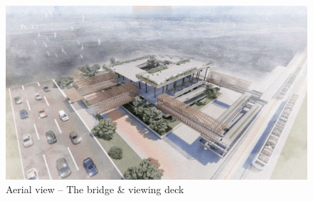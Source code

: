 ﻿%
\begin{figure}[H]
	\centering
	\includegraphics[width=\linewidth]{src/graphics/rawa-buntu-station-2-0--perspective-aerial.jpg}
	\caption*{
		Aerial view -- The bridge \& viewing deck
	}
	\label{
		fig:rawa-buntu-station-2-0--perspective-aerial
	}
\end{figure}
